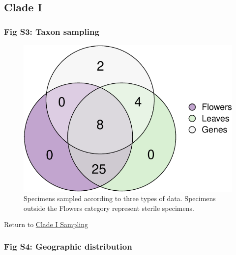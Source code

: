 \documentclass[
  11pt,
]{article}
\begin{document}
\hypertarget{clade-i-2}{%
\subsection{Clade I}\label{clade-i-2}}

\hypertarget{fig-s3-taxon-sampling}{%
\subsubsection{Fig S3: Taxon sampling}\label{fig-s3-taxon-sampling}}

\begin{figure}

{\centering \includegraphics{Supplementary_Material_files/figure-latex/CladeIVennDiagram-1} 

}

\caption{Specimens sampled according to three types of data. Specimens outside the Flowers category represent sterile specimens.}\label{fig:CladeIVennDiagram}
\end{figure}

Return to \protect\hyperlink{sampling-1}{Clade I Sampling}
\pagebreak

\hypertarget{fig-s4-geographic-distribution}{%
\subsubsection{Fig S4: Geographic distribution}\label{fig-s4-geographic-distribution}}
\end{document}
